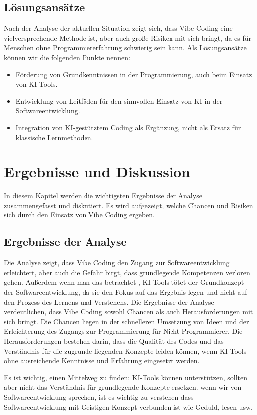 \documentclass[paper=a4,fontsize=12pt,ngerman]{scrartcl}
\begin{document}
\subsection{Lösungsansätze}
Nach der Analyse der aktuellen Situation zeigt sich, dass Vibe Coding eine vielversprechende Methode ist, aber auch große Risiken mit sich bringt, da es für Menschen ohne Programmiererfahrung schwierig sein kann. 
Als Lösungsansätze können wir die folgenden Punkte nennen:
\begin{itemize}
    \item Förderung von Grundkenntnissen in der Programmierung, auch beim Einsatz von KI-Tools.
    \item Entwicklung von Leitfäden für den sinnvollen Einsatz von KI in der Softwareentwicklung.
    \item Integration von KI-gestütztem Coding als Ergänzung, nicht als Ersatz für klassische Lernmethoden.
\end{itemize}

\newpage
\clearpage
\section{Ergebnisse und Diskussion}
In diesem Kapitel werden die wichtigsten Ergebnisse der Analyse zusammengefasst und diskutiert. Es wird aufgezeigt, welche Chancen und Risiken sich durch den Einsatz von Vibe Coding ergeben.

\subsection{Ergebnisse der Analyse}
Die Analyse zeigt, dass Vibe Coding den Zugang zur Softwareentwicklung erleichtert, aber auch die Gefahr birgt, dass grundlegende Kompetenzen verloren gehen.
Außerdem wenn man das betrachtet , KI-Tools tötet der Grundkonzept der Softwareentwicklung, da sie den Fokus auf das Ergebnis legen und nicht auf den Prozess des Lernens und Verstehens.
Die Ergebnisse der Analyse verdeutlichen, dass Vibe Coding sowohl Chancen als auch Herausforderungen mit sich bringt.
Die Chancen liegen in der schnelleren Umsetzung von Ideen und der Erleichterung des Zugangs zur Programmierung für Nicht-Programmierer.
Die Herausforderungen bestehen darin, dass die Qualität des Codes und das Verständnis für die zugrunde liegenden Konzepte leiden können, wenn KI-Tools ohne ausreichende Kenntnisse und Erfahrung eingesetzt werden.


Es ist wichtig, einen Mittelweg zu finden: KI-Tools können unterstützen, sollten aber nicht das Verständnis für grundlegende Konzepte ersetzen.
wenn wir von Softwareentwicklung sprechen, ist es wichtig zu verstehen dass Softwareentwicklung mit Geistigen Konzept verbunden ist wie Geduld, lesen usw.
\end{document}
